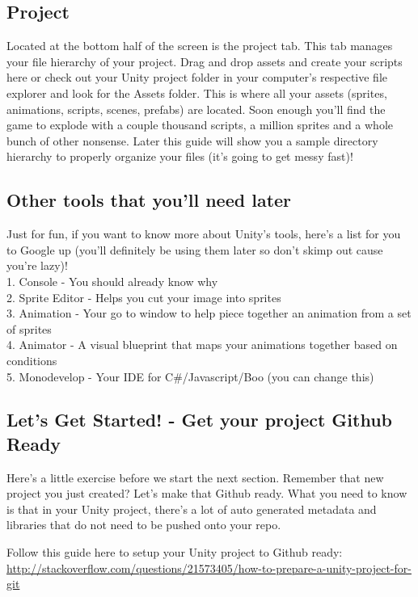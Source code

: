 \documentclass[12pt]{article}
\begin{document}
\subsection{Project}
Located at the bottom half of the screen is the project tab. This tab manages your file hierarchy of your project. Drag and drop assets and create your scripts here or check out your Unity project folder in your computer's respective file explorer and look for the Assets folder. This is where all your assets (sprites, animations, scripts, scenes, prefabs) are located. Soon enough you'll find the game to explode with a couple thousand scripts, a million sprites and a whole bunch of other nonsense. Later this guide will show you a sample directory hierarchy to properly organize your files (it's going to get messy fast)!

\subsection{Other tools that you'll need later}
Just for fun, if you want to know more about Unity's tools, here's a list for you to Google up (you'll definitely be using them later so don't skimp out cause you're lazy)! \\
1. Console - You should already know why\\
2. Sprite Editor - Helps you cut your image into sprites\\
3. Animation - Your go to window to help piece together an animation from a set of sprites\\
4. Animator - A visual blueprint that maps your animations together based on conditions\\
5. Monodevelop - Your IDE for C\#/Javascript/Boo (you can change this)\\

\newpage

\subsection{Let's Get Started! - Get your project Github Ready}
Here's a little exercise before we start the next section. Remember that new project you just created? Let's make that Github ready. What you need to know is that in your Unity project, there's a lot of auto generated metadata and libraries that do not need to be pushed onto your repo. 

Follow this guide here to setup your Unity project to Github ready: \url{http://stackoverflow.com/questions/21573405/how-to-prepare-a-unity-project-for-git}
\end{document}
